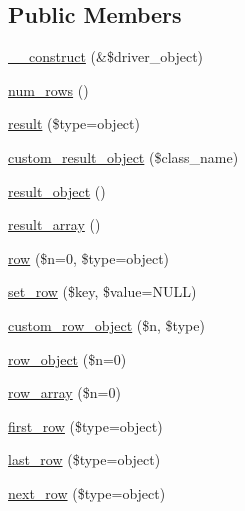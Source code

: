 \subsection*{Public Members}
\begin{DoxyCompactItemize}
\item 
\mbox{\hyperlink{class_c_i___d_b__result_a8e093c8b6e5733bc3f306385ee426ab7}{\+\_\+\+\_\+construct}} (\&\$driver\+\_\+object)
\item 
\mbox{\hyperlink{class_c_i___d_b__result_a218657c303ee499b97710ab0cd2f5d6e}{num\+\_\+rows}} ()
\item 
\mbox{\hyperlink{class_c_i___d_b__result_a86bc3a5f1694241cf86a6fd754553884}{result}} (\$type=\textquotesingle{}object\textquotesingle{})
\item 
\mbox{\hyperlink{class_c_i___d_b__result_a5ac3523f878efb629fae30a7d9156e77}{custom\+\_\+result\+\_\+object}} (\$class\+\_\+name)
\item 
\mbox{\hyperlink{class_c_i___d_b__result_a266a17f340dab35b8f2858931ff772a2}{result\+\_\+object}} ()
\item 
\mbox{\hyperlink{class_c_i___d_b__result_a444f7dd61bfbe3931a7188adad61feae}{result\+\_\+array}} ()
\item 
\mbox{\hyperlink{class_c_i___d_b__result_a43764449dacaf9b61bbd1efee9cdb256}{row}} (\$n=0, \$type=\textquotesingle{}object\textquotesingle{})
\item 
\mbox{\hyperlink{class_c_i___d_b__result_a77628e90fac65184ec9f583e7c30a48a}{set\+\_\+row}} (\$key, \$value=N\+U\+LL)
\item 
\mbox{\hyperlink{class_c_i___d_b__result_a223538c34395626655fd483f3a55e653}{custom\+\_\+row\+\_\+object}} (\$n, \$type)
\item 
\mbox{\hyperlink{class_c_i___d_b__result_a0bd3520c57f5cb192bdfaeed1f597c0a}{row\+\_\+object}} (\$n=0)
\item 
\mbox{\hyperlink{class_c_i___d_b__result_a8dbff471ffdaf617d49189f8636e4f81}{row\+\_\+array}} (\$n=0)
\item 
\mbox{\hyperlink{class_c_i___d_b__result_a9d7ddad4b02edf86c4f1ec27c0c8a2d7}{first\+\_\+row}} (\$type=\textquotesingle{}object\textquotesingle{})
\item 
\mbox{\hyperlink{class_c_i___d_b__result_a2c420342d5b577d91b6b993be86f68c0}{last\+\_\+row}} (\$type=\textquotesingle{}object\textquotesingle{})
\item 
\mbox{\hyperlink{class_c_i___d_b__result_a5664a519252b14c1cdd93d9de0322a9f}{next\+\_\+row}} (\$type=\textquotesingle{}object\textquotesingle{})

\end{DoxyCompactItemize}
